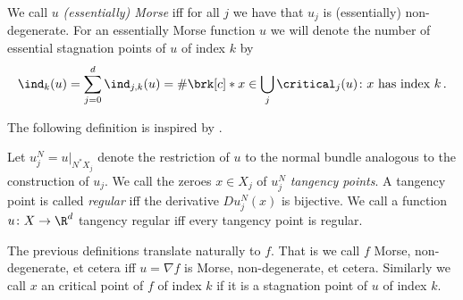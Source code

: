 \begin{definition}
  We call $u$ \emph{(essentially) Morse} iff for all $j$ we have that $u_j$ is (essentially) non-degenerate.
  For an essentially Morse function $u$ we will denote the number of
  essential stagnation points of $u$ of index $k$ by
  \begin{align*}
    \ind_k(u)=\sum_{j=0}^d\ind_{j,k}(u)=\#\brk[c]*{x\in\bigcup_j\critical_j(u)\colon x\text{ has index }k}\,.
  \end{align*}
\end{definition}

The following definition is inspired by \cite{Katz2014}.
\begin{definition}
  Let $u^N_j=u\big\vert_{N^*X_j}$ denote the restriction of $u$ to the normal bundle analogous to the construction of $u_j$.
  We call the zeroes $x\in X_j$ of $u^N_j$ \emph{tangency points}.
  A tangency point is called \emph{regular} iff the derivative $Du^N_j(x)$ is bijective.
  We call a function $u\colon X\to\R^d$ tangency regular iff every tangency point
  is regular.
\end{definition}

The previous definitions translate naturally to $f$.
That is we call $f$ Morse, non-degenerate, et cetera iff $u=\nabla f$ is Morse, non-degenerate, et cetera.
Similarly we call $x$ an critical point of $f$ of index $k$ if it is a
stagnation point of $u$ of index $k$.

